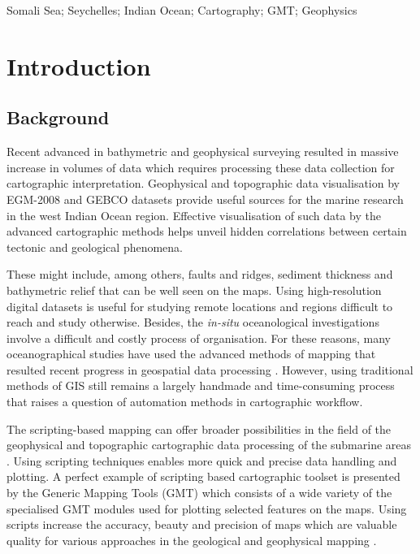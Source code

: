 \documentclass[]{interact}
\begin{document}
\begin{keywords}
Somali Sea; Seychelles; Indian Ocean; Cartography; GMT; Geophysics
\end{keywords}

\section{Introduction}
  \subsection{Background}
Recent advanced in bathymetric and geophysical surveying resulted in massive increase in volumes of data  which requires processing these data collection for cartographic interpretation. Geophysical and topographic data visualisation by EGM-2008 and GEBCO datasets provide useful sources for the marine research in the west Indian Ocean region. Effective visualisation of such data by the advanced cartographic methods helps unveil hidden correlations between certain tectonic and geological phenomena.
 
These might include, among others, faults and ridges, sediment thickness and bathymetric relief that can be well seen on the maps. Using high-resolution digital datasets is useful for studying remote locations and regions difficult to reach and study otherwise. Besides, the \emph{in-situ} oceanological investigations involve a difficult and costly process of organisation. For these reasons, many oceanographical studies have used the advanced methods of mapping that resulted recent progress in geospatial data processing \cite{Nonn,Schenke,Trottetal2017,Suetovaetal2005,Lemenkova202032,Gauger,Lemenkova202015,Lemenkova202123}. However, using traditional methods of GIS still remains a largely handmade and time-consuming process that raises a question of automation methods in cartographic workflow. 
 
The scripting-based mapping can offer broader possibilities in the field of the geophysical and topographic cartographic data processing of the submarine areas \cite{Smith1993}. Using scripting techniques enables more quick and precise data handling and plotting. A perfect example of scripting based cartographic toolset is presented by the Generic Mapping Tools (GMT) which consists of a wide variety of the specialised GMT modules used for plotting selected features on the maps. Using scripts increase the accuracy, beauty and precision of maps which are valuable quality for various approaches in the geological and geophysical mapping \cite{WesselSmith1995}. 
\end{document}
